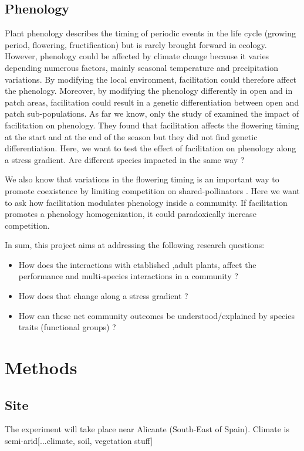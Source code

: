 \documentclass[12pt]{article} %
\begin{document}
\subsection{Phenology}
Plant phenology describes the timing of periodic events in the life cycle (growing period, flowering, fructification) but is rarely brought forward in ecology.
However, phenology could be affected by climate change \citep{Cleland2007} because it varies depending numerous factors, mainly seasonal temperature and precipitation variations. By modifying the local environment, facilitation could therefore affect the phenology. Moreover, by modifying the phenology differently in open and in patch areas, facilitation could result in a genetic differentiation between open and patch sub-populations. As far we know, only the study of \citet{Castellanos2014} examined the impact of facilitation on phenology. They found that facilitation affects the flowering timing at the start and at the end of the season but they did not find genetic differentiation. Here, we want to test the effect of facilitation on phenology along a stress gradient. Are different species impacted in the same way ?

We also know that variations in the flowering timing is an important way to promote coexistence by limiting competition on shared-pollinators \citep{Cleland2006}. Here we want to ask how facilitation modulates phenology inside a community. If facilitation promotes a phenology homogenization, it could paradoxically increase competition. 

In sum, this project aims at addressing the following research questions:
\begin{itemize}
	\item How does the interactions with etablished ,adult plants, affect the performance and multi-species interactions in a community ?
	\item How does that change along a stress gradient ?
	\item How can these net community outcomes be understood/explained by species traits (functional groups) ?
\end{itemize}


\section{Methods}
\subsection{Site}
The experiment will take place near Alicante (South-East of Spain). Climate is semi-arid[...climate, soil, vegetation stuff]
\end{document}
